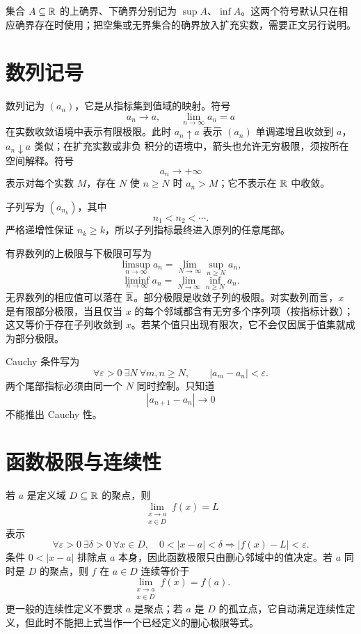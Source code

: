 集合 \(A\subseteq\mathbb{R}\) 的上确界、下确界分别记为 \(\sup A\)、\(\inf A\)。这两个符号默认只在相应确界存在时使用；把空集或无界集合的确界放入扩充实数，需要正文另行说明。

\section{数列记号}

数列记为 \((a_n)\)，它是从指标集到值域的映射。符号
\[
 a_n\to a,\qquad \lim_{n\to\infty}a_n=a
\]
在实数收敛语境中表示有限极限。此时 \(a_n\uparrow a\) 表示 \((a_n)\)
单调递增且收敛到 \(a\)，\(a_n\downarrow a\) 类似；在扩充实数或非负
积分的语境中，箭头也允许无穷极限，须按所在空间解释。符号
\[
 a_n\to+\infty
\]
表示对每个实数 \(M\)，存在 \(N\) 使 \(n\ge N\) 时 \(a_n>M\)；它不表示在 \(\mathbb{R}\) 中收敛。

子列写为 \((a_{n_k})\)，其中
\[
 n_1<n_2<\cdots.
\]
严格递增性保证 \(n_k\ge k\)，所以子列指标最终进入原列的任意尾部。

有界数列的上极限与下极限可写为
\[
 \limsup_{n\to\infty}a_n
 =\lim_{N\to\infty}\sup_{n\ge N}a_n,
\]
\[
 \liminf_{n\to\infty}a_n
 =\lim_{N\to\infty}\inf_{n\ge N}a_n.
\]
无界数列的相应值可以落在 \(\overline{\mathbb{R}}\)。部分极限是收敛子列的极限。对实数列而言，\(x\) 是有限部分极限，当且仅当 \(x\) 的每个邻域都含有无穷多个序列项（按指标计数）；这又等价于存在子列收敛到 \(x\)。若某个值只出现有限次，它不会仅因属于值集就成为部分极限。

Cauchy 条件写为
\[
 \forall\varepsilon>0\ \exists N\ \forall m,n\ge N,
 \qquad |a_m-a_n|<\varepsilon.
\]
两个尾部指标必须由同一个 \(N\) 同时控制。只知道
\[
 |a_{n+1}-a_n|\to0
\]
不能推出 Cauchy 性。

\section{函数极限与连续性}

若 \(a\) 是定义域 \(D\subseteq\mathbb{R}\) 的聚点，则
\[
 \lim_{\substack{x\to a\\x\in D}}f(x)=L
\]
表示
\[
 \forall\varepsilon>0\ \exists\delta>0\
 \forall x\in D,\quad
 0<|x-a|<\delta\Longrightarrow |f(x)-L|<\varepsilon.
\]
条件 \(0<|x-a|\) 排除点 \(a\) 本身，因此函数极限只由删心邻域中的值决定。若 \(a\) 同时是 \(D\) 的聚点，则 \(f\) 在 \(a\in D\) 连续等价于
\[
 \lim_{\substack{x\to a\\x\in D}}f(x)=f(a).
\]
更一般的连续性定义不要求 \(a\) 是聚点；若 \(a\) 是 \(D\) 的孤立点，它自动满足连续性定义，但此时不能把上式当作一个已经定义的删心极限等式。

